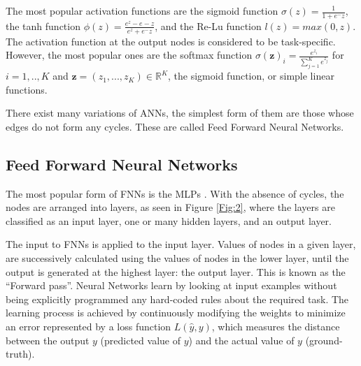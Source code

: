 

The most popular activation functions are the sigmoid function $  \sigma(z) =  \frac{\mathrm{1} }{\mathrm{1} + e^-z }  $, the tanh function $  \phi(z) =  \frac{ e^z - e-z }{e^z + e^-z }  $, and the Re-Lu function $ l(z) = max(0,z) $. The activation function at the output nodes is considered to be task-specific. However, the most popular ones are the softmax function $ \sigma(\mathbf{z})_i = \frac{ e^ {z_i} }{ \sum_{j=1}^{K} e^{z_j} }$ for $i=1,..,K$ and $\mathbf{z}=(z_1,...,z_K) \in \mathds{R}^K $, the sigmoid function, or simple linear functions.


There exist many variations of \ac{ANN}s, the simplest form of them are those whose edges do not form any cycles. These are called Feed Forward Neural Networks.


\subsection{Feed Forward Neural Networks}
\label{bg:sub1}
The most popular form of \ac{FNN}s is the \ac{MLP}s \cite{rumelhart1985learning} \cite{werbos1988generalization} \cite{bishop1995neural}.
With the absence of cycles, the nodes are arranged into layers, as seen in Figure \ref{Fig:2}, where the layers are classified as an input layer, one or many hidden layers, and an output layer. 



The input to \ac{FNN}s is applied to the input layer. Values of nodes in a given layer, are successively calculated using the values of nodes in the lower layer, until the output is generated at the highest layer: the output layer. This is known as the \enquote{Forward pass}.
Neural Networks learn by looking at input examples without being explicitly programmed any hard-coded rules about the required task. The learning process is achieved by continuously modifying the weights to minimize an error represented by a loss function $ L(\widehat{y}, y) $, which measures the distance between the output $y$ (predicted value of $y$) and the actual value of $y$ (ground-truth).

